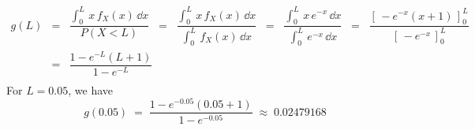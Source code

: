 \begin{eqnarray*}
g(L)
&=&       \dfrac{\int_{0}^{L}\,x\,f_{X}(x)\,\dd x}{P(X<L)}
\;\;=\;\; \dfrac{\int_{0}^{L}\,x\,f_{X}(x)\,\dd x}{\int_{0}^{L}\,f_{X}(x)\,\dd x}
\;\;=\;\; \dfrac{\int_{0}^{L}\,x\,e^{-x}\,\dd x}{\int_{0}^{L}\,e^{-x}\,\dd x}
\;\;=\;\; \dfrac{\left[\,-e^{-x}(x+1)\,\right]_{0}^{L}}{\left[\,-e^{-x}\,\right]_{0}^{L}}
\\
&=& \dfrac{1 - e^{-L}(L+1)}{1 - e^{-L}}
\\
\end{eqnarray*}
For $L = 0.05$, we have
\begin{equation*}
g(0.05) \;=\; \dfrac{1 - e^{-0.05}(0.05+1)}{1 - e^{-0.05}} \;\approx\; 0.02479168
\end{equation*}

